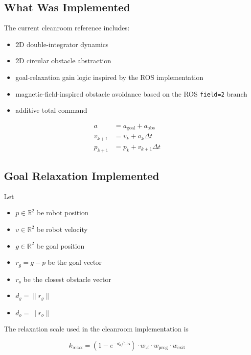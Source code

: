 \documentclass[11pt]{article}
\begin{document}
\subsection*{What Was Implemented}

The current cleanroom reference includes:

\begin{itemize}[leftmargin=*]
  \item 2D double-integrator dynamics
  \item 2D circular obstacle abstraction
  \item goal-relaxation gain logic inspired by the ROS implementation
  \item magnetic-field-inspired obstacle avoidance based on the ROS \texttt{field=2} branch
  \item additive total command
\end{itemize}

\begin{align}
a &= a_{\text{goal}} + a_{\text{obs}} \\
v_{k+1} &= v_k + a_k \Delta t \\
p_{k+1} &= p_k + v_{k+1}\Delta t
\end{align}

\subsection*{Goal Relaxation Implemented}

Let
\begin{itemize}[leftmargin=*]
  \item $p \in \mathbb{R}^2$ be robot position
  \item $v \in \mathbb{R}^2$ be robot velocity
  \item $g \in \mathbb{R}^2$ be goal position
  \item $r_g = g - p$ be the goal vector
  \item $r_o$ be the closest obstacle vector
  \item $d_g = \lVert r_g \rVert$
  \item $d_o = \lVert r_o \rVert$
\end{itemize}

The relaxation scale used in the cleanroom implementation is

\begin{equation}
k_{\text{relax}}
=
\left(1 - e^{-d_o/1.5}\right)
\cdot
w_{\angle}
\cdot
w_{\text{prog}}
\cdot
w_{\text{exit}}
\end{equation}
\end{document}
